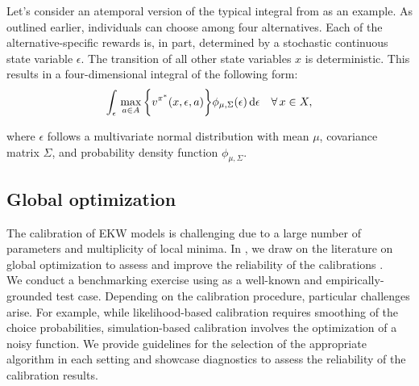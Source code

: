\noindent Let's consider an atemporal version of the typical integral from \citet{Keane.1994} as an example. As outlined earlier, individuals can choose among four alternatives. Each of the alternative-specific rewards is, in part, determined by a stochastic continuous state variable $\epsilon$. The transition of all other state variables $x$ is deterministic. This results in a four-dimensional integral of the following form:
%
\begin{align*}
   \int_{\epsilon}\, \max_{a\in A} \bigg\{v^{\pi^*}(x, \epsilon, a)\bigg\} \phi_{\mu, \Sigma}(\epsilon) \mathop{}\!\mathrm{d}\epsilon \quad\forall\, x \in X,
\end{align*}

\noindent where $\epsilon$ follows a multivariate normal distribution with mean $\mu$, covariance matrix $ \Sigma$, and probability density function $\phi_{\mu, \Sigma}$.
\subsection{Global optimization}
The calibration of EKW models is challenging due to a large number of parameters and multiplicity of local minima. In \citet{Gabler.2020}, we draw on the literature on global optimization to assess and improve the reliability of the calibrations \citep{Locatelli.2013, Nocedal.2006}.\\

\noindent We conduct a benchmarking exercise using \citet{Keane.1994, Keane.1997} as a well-known and empirically-grounded test case. Depending on the calibration procedure, particular challenges arise. For example, while likelihood-based calibration requires smoothing of the choice probabilities, simulation-based calibration involves the optimization of a noisy function. We provide guidelines for the selection of the appropriate algorithm in each setting and showcase diagnostics to assess the reliability of the calibration results.
